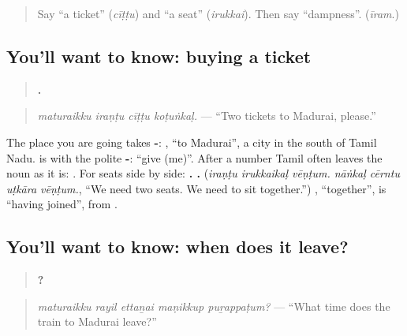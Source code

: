 \label{lesson:TA-C289-cittu-kotunkal}



\begin{quote}
Say \textquotedblleft{}a ticket\textquotedblright{} (\emph{cīṭṭu}) and \textquotedblleft{}a seat\textquotedblright{} (\emph{irukkai}). Then say \textquotedblleft{}dampness\textquotedblright{}. (\emph{īram}.)
\end{quote}

\subsection*{You'll want to know: buying a ticket}
\begin{quote}
\textbf{   .}
\end{quote}

\begin{quote}
\emph{maturaikku iraṇṭu cīṭṭu koṭuṅkaḷ.} — \textquotedblleft{}Two tickets to Madurai, please.\textquotedblright{}
\end{quote}

The place you are going takes \textbf{-}: \textbf{}, \textquotedblleft{}to Madurai\textquotedblright{}, a city in the south of Tamil Nadu. \textbf{} is \textbf{} with the polite \textbf{-}: \textquotedblleft{}give (me)\textquotedblright{}. After a number Tamil often leaves the noun as it is: \textbf{ }. For seats side by side: \textbf{  .    .} (\emph{iraṇṭu irukkaikaḷ vēṇṭum. nāṅkaḷ cērntu uṭkāra vēṇṭum.}, \textquotedblleft{}We need two seats. We need to sit together.\textquotedblright{}) \textbf{}, \textquotedblleft{}together\textquotedblright{}, is \textquotedblleft{}having joined\textquotedblright{}, from \textbf{}.

\subsection*{You'll want to know: when does it leave?}
\begin{quote}
\textbf{    ?}
\end{quote}

\begin{quote}
\emph{maturaikku rayil ettaṉai maṇikkup puṟappaṭum?} — \textquotedblleft{}What time does the train to Madurai leave?\textquotedblright{}
\end{quote}

